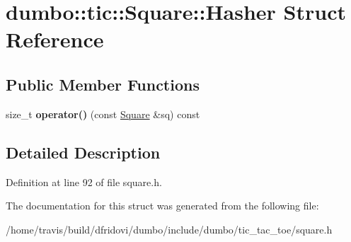 \hypertarget{structdumbo_1_1tic_1_1_square_1_1_hasher}{\section{dumbo\-:\-:tic\-:\-:Square\-:\-:Hasher Struct Reference}
\label{structdumbo_1_1tic_1_1_square_1_1_hasher}
}
\subsection*{Public Member Functions}
\begin{DoxyCompactItemize}
\item 
\hypertarget{structdumbo_1_1tic_1_1_square_1_1_hasher_ac82f53735d689a147db1bd0af659703e}{size\-\_\-t {\bfseries operator()} (const \hyperlink{structdumbo_1_1tic_1_1_square}{Square} \&sq) const }\label{structdumbo_1_1tic_1_1_square_1_1_hasher_ac82f53735d689a147db1bd0af659703e}

\end{DoxyCompactItemize}


\subsection{Detailed Description}


Definition at line 92 of file square.\-h.



The documentation for this struct was generated from the following file\-:\begin{DoxyCompactItemize}
\item 
/home/travis/build/dfridovi/dumbo/include/dumbo/tic\-\_\-tac\-\_\-toe/square.\-h\end{DoxyCompactItemize}
